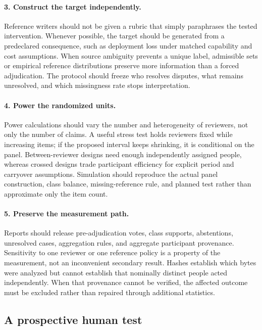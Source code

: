 \documentclass[11pt]{article}
\begin{document}
\paragraph{3. Construct the target independently.}
Reference writers should not be given a rubric that simply paraphrases the
tested intervention. Whenever possible, the target should be generated from a
predeclared consequence, such as deployment loss under matched capability and
cost assumptions. When source ambiguity prevents a unique label, admissible
sets or empirical reference distributions preserve more information than a
forced adjudication. The protocol should freeze who resolves disputes, what
remains unresolved, and which missingness rate stops interpretation.

\paragraph{4. Power the randomized units.}
Power calculations should vary the number and heterogeneity of reviewers, not
only the number of claims. A useful stress test holds reviewers fixed while
increasing items; if the proposed interval keeps shrinking, it is conditional
on the panel. Between-reviewer designs need enough independently assigned
people, whereas crossed designs trade participant efficiency for explicit
period and carryover assumptions. Simulation should reproduce the actual
panel construction, class balance, missing-reference rule, and planned test
rather than approximate only the item count.

\paragraph{5. Preserve the measurement path.}
Reports should release pre-adjudication votes, class supports, abstentions,
unresolved cases, aggregation rules, and aggregate participant provenance.
Sensitivity to one reviewer or one reference policy is a property of the
measurement, not an inconvenient secondary result. Hashes establish which
bytes were analyzed but cannot establish that nominally distinct people acted
independently. When that provenance cannot be verified, the affected outcome
must be excluded rather than repaired through additional statistics.

\subsection{A prospective human test}
\label{sec:corrected}
\end{document}
